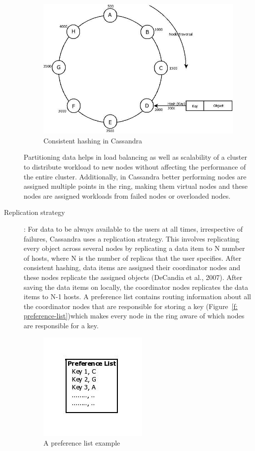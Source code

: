 \begin{description}
\begin{figure}[h]
	\centering
	\includegraphics[width=.6\textwidth]{./figure/Solutions/Consistent-hashing-Cassandra.png}
	\caption{Consistent hashing in Cassandra}\label{f:consistent hashing}
\end{figure}

Partitioning data helps in load balancing as well as scalability of a cluster to
distribute workload to new nodes without affecting the performance of the
entire cluster. Additionally, in Cassandra better performing nodes are assigned
multiple points in the ring, making them virtual nodes and these nodes are assigned
  workloads from failed nodes or overloaded nodes. 

  \item  [Replication strategy]: For data to be always available to
  the users at all times, irrespective of failures, Cassandra uses a
  replication strategy. This involves replicating every object
  across several nodes by replicating a data item to N number of hosts, where N
  is the number of replicas that the user specifies. After consistent
  hashing, data items are assigned their coordinator nodes and these  nodes
  replicate the assigned objects (DeCandia et al., 2007). After saving the data
  items on locally, the coordinator nodes replicates the data items to N-1
  hosts. A preference list contains routing information about all the
  coordinator nodes that are responsible for storing a key (Figure~\ref{f:
  preference-list})which makes every node in the ring aware of which nodes are
  responsible for a key.
 
\begin{figure}[h]
	\centering
	\includegraphics[width=.4\textwidth]{./figure/Solutions/Preference-list.png}
	\caption{A preference list example}\label{f: preference-list}
\end{figure}


\end{description}
